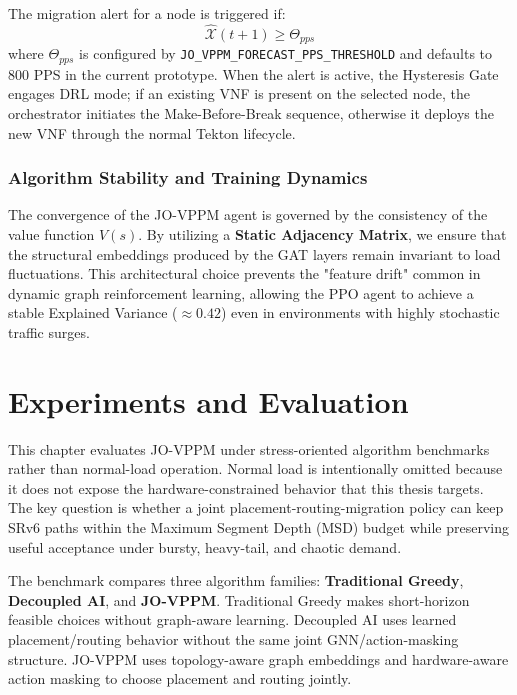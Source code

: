 \documentclass[12pt, a4paper, reqno, oneside]{book}
\begin{document}
The migration alert for a node is triggered if:
\begin{equation}
\hat{\mathcal{X}}(t+1) \ge \Theta_{pps}
\end{equation}
where $\Theta_{pps}$ is configured by \texttt{JO\_VPPM\_FORECAST\_PPS\_THRESHOLD} and defaults to 800 PPS in the current prototype. When the alert is active, the Hysteresis Gate engages DRL mode; if an existing VNF is present on the selected node, the orchestrator initiates the Make-Before-Break sequence, otherwise it deploys the new VNF through the normal Tekton lifecycle.

\subsection{Algorithm Stability and Training Dynamics}
The convergence of the JO-VPPM agent is governed by the consistency of the value function $V(s)$. By utilizing a \textbf{Static Adjacency Matrix}, we ensure that the structural embeddings produced by the GAT layers remain invariant to load fluctuations. This architectural choice prevents the "feature drift" common in dynamic graph reinforcement learning, allowing the PPO agent to achieve a stable Explained Variance ($\approx 0.42$) even in environments with highly stochastic traffic surges.




\chapter{Experiments and Evaluation}
\label{chap:experiments}

This chapter evaluates JO-VPPM under stress-oriented algorithm benchmarks rather than normal-load operation. Normal load is intentionally omitted because it does not expose the hardware-constrained behavior that this thesis targets. The key question is whether a joint placement-routing-migration policy can keep SRv6 paths within the Maximum Segment Depth (MSD) budget while preserving useful acceptance under bursty, heavy-tail, and chaotic demand.

The benchmark compares three algorithm families: \textbf{Traditional Greedy}, \textbf{Decoupled AI}, and \textbf{JO-VPPM}. Traditional Greedy makes short-horizon feasible choices without graph-aware learning. Decoupled AI uses learned placement/routing behavior without the same joint GNN/action-masking structure. JO-VPPM uses topology-aware graph embeddings and hardware-aware action masking to choose placement and routing jointly.
\end{document}
